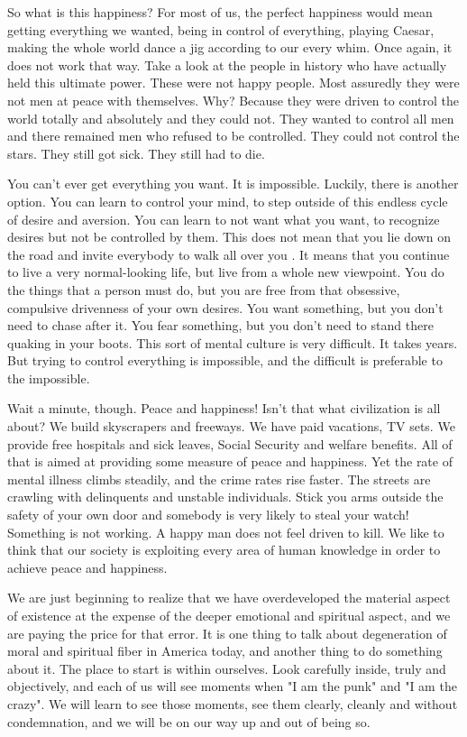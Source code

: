 So what is this happiness? For most of us, the perfect happiness would mean
getting everything we wanted, being in control of everything, playing Caesar,
making the whole world dance a jig according to our every whim. Once again, it
does not work that way. Take a look at the people in history who have actually
held this ultimate power. These were not happy people. Most assuredly they were
not men at peace with themselves. Why? Because they were driven to control the
world totally and absolutely and they could not. They wanted to control all men
and there remained men who refused to be controlled. They could not control the
stars. They still got sick. They still had to die.

You can't ever get everything you want. It is impossible. Luckily, there is
another option. You can learn to control your mind, to step outside of this
endless cycle of desire and aversion. You can learn to not want what you want,
to recognize desires but not be controlled by them. This does not mean that you
lie down on the road and invite everybody to walk all over you . It means that
you continue to live a very normal-looking life, but live from a whole new
viewpoint. You do the things that a person must do, but you are free from that
obsessive, compulsive drivenness of your own desires. You want something, but
you don't need to chase after it. You fear something, but you don't need to
stand there quaking in your boots. This sort of mental culture is very
difficult.  It takes years. But trying to control everything is impossible, and
the difficult is preferable to the impossible.

Wait a minute, though. Peace and happiness! Isn't that what civilization is all
about? We build skyscrapers and freeways. We have paid vacations, TV sets. We
provide free hospitals and sick leaves, Social Security and welfare benefits.
All of that is aimed at providing some measure of peace and happiness. Yet the
rate of mental illness climbs steadily, and the crime rates rise faster.  The
streets are crawling with delinquents and unstable individuals. Stick you arms
outside the safety of your own door and somebody is very likely to steal your
watch! Something is not working. A happy man does not feel driven to kill. We
like to think that our society is exploiting every area of human knowledge in
order to achieve peace and happiness.

We are just beginning to realize that we have overdeveloped the material aspect
of existence at the expense of the deeper emotional and spiritual aspect, and we
are paying the price for that error. It is one thing to talk about degeneration
of moral and spiritual fiber in America today, and another thing to do something
about it. The place to start is within ourselves. Look carefully inside, truly
and objectively, and each of us will see moments when "I am the punk" and "I am
the crazy". We will learn to see those moments, see them clearly, cleanly and
without condemnation, and we will be on our way up and out of being so.

